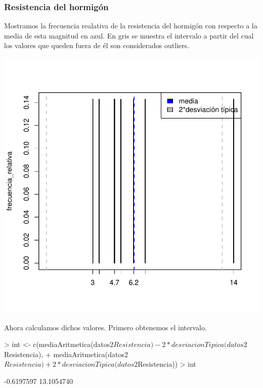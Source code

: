 \documentclass [a4paper] {article}
\begin{document}
\subsubsection{Resistencia del hormigón}
Mostramos la frecuencia realativa de la resistencia del hormigón con respecto a la media de esta magnitud en azul.
En gris se muestra el intervalo a partir del cual los valores que queden fuera de él son considerados outliers.
\begin{center}
\begin{Schunk}
\end{Schunk}
\includegraphics{entrega-desviacion_tipica_resistencia_plot}
\end{center}
Ahora calculamos dichos valores.
Primero obtenemos el intervalo.
\begin{Schunk}
\begin{Sinput}
> int <- c(mediaAritmetica(datos2$Resistencia) - 2*desviacionTipica(datos2$Resistencia), 
+          mediaAritmetica(datos2$Resistencia) + 2*desviacionTipica(datos2$Resistencia))
> int
\end{Sinput}
\begin{Soutput}
[1] -0.6197597 13.1054740
\end{Soutput}
\end{Schunk}
\end{document}
